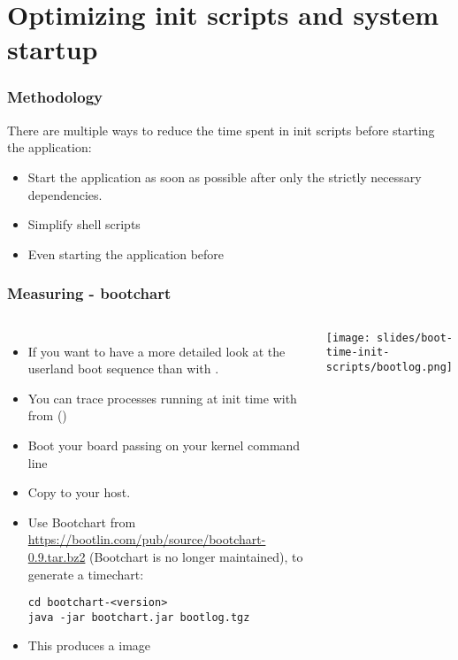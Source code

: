 \section{Optimizing init scripts and system startup}
\begin{frame}
\frametitle{Methodology}
There are multiple ways to reduce the time spent in init scripts before
starting the application:
\begin{itemize}
        \item Start the application as soon as possible after only the
              strictly necessary dependencies.
        \item Simplify shell scripts
        \item Even starting the application before 
\end{itemize}
\end{frame}

\begin{frame}[fragile]
\frametitle{Measuring - bootchart}
\begin{columns}
\small
\begin{itemize}
        \item If you want to have a more detailed look at the userland boot sequence
              than with .
        \item You can trace processes running at init time with 
              from  ()
        \item Boot your board passing  on your
              kernel command line
        \item Copy  to your host.
        \item Use Bootchart from
              \url{https://bootlin.com/pub/source/bootchart-0.9.tar.bz2}
              (Bootchart is no longer maintained), to generate a timechart:
\begin{block}{}
\begin{verbatim}
cd bootchart-<version>
java -jar bootchart.jar bootlog.tgz
\end{verbatim}
\end{block}
        \item This produces a  image
\end{itemize}
\texttt{[image: slides/boot-time-init-scripts/bootlog.png]}
\end{columns}
\end{frame}

